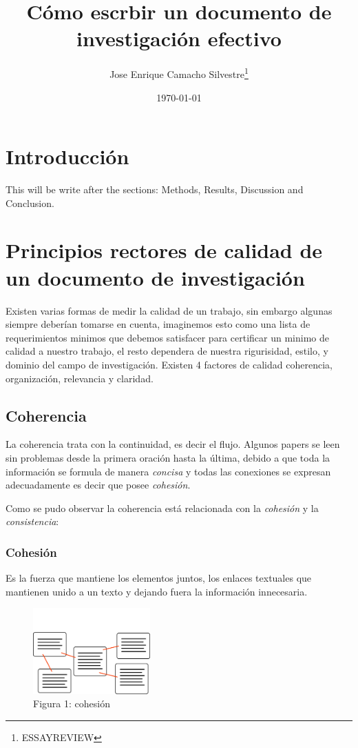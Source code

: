 \documentclass[a4paper, 12pt]{article}
\title{C\'omo escrbir un documento de investigaci\'on efectivo}
\author{Jose Enrique Camacho Silvestre\thanks{ESSAYREVIEW}}
\date{\today}
\begin{document}
	\maketitle
	
	\section{Introducci\'on}
	This will be write after the sections: Methods, Results, Discussion and Conclusion.
	
	\section{Principios rectores de calidad de un documento de investigaci\'on}
		Existen varias formas de medir la calidad de un trabajo, sin embargo algunas siempre deber\'ian tomarse en cuenta, imaginemos esto como una lista de requerimientos minimos que debemos satisfacer para certificar un minimo de calidad a nuestro trabajo, el resto dependera de nuestra rigurisidad, estilo, y dominio del campo de investigaci\'on. Existen 4 factores de calidad coherencia, organizaci\'on, relevancia y claridad.
		
		\subsection{Coherencia}
			La coherencia trata con la continuidad, es decir el flujo. Algunos papers se leen sin problemas desde la primera oraci\'on hasta la \'ultima, debido a que toda la informaci\'on se formula de manera \emph{concisa} y todas las conexiones se expresan adecuadamente es decir que posee \emph{cohesi\'on}.
			 
			 Como se pudo observar la coherencia est\'a relacionada con la \emph{cohesi\'on} y la \emph{consistencia}:
			\subsubsection{Cohesi\'on}
				Es la fuerza que mantiene los elementos juntos, los enlaces textuales que mantienen unido a un texto y dejando fuera la informaci\'on innecesaria.
					\begin{figure}[h]
						\centering
						\includegraphics[width=0.4\textwidth]{cohesion.pdf}
						\caption{Figura 1: cohesi\'on}
						\label{fig: fig1}
					\end{figure}
\end{document}
